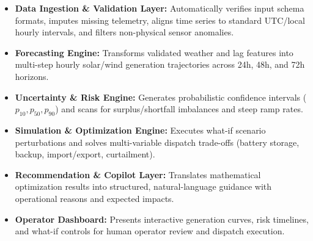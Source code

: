 \begin{itemize}[leftmargin=1.5em, itemsep=0.25em]
    \item \textbf{Data Ingestion \& Validation Layer:} Automatically verifies input schema formats, imputes missing telemetry, aligns time series to standard UTC/local hourly intervals, and filters non-physical sensor anomalies.
    \item \textbf{Forecasting Engine:} Transforms validated weather and lag features into multi-step hourly solar/wind generation trajectories across 24h, 48h, and 72h horizons.
    \item \textbf{Uncertainty \& Risk Engine:} Generates probabilistic confidence intervals ($p_{10}, p_{50}, p_{90}$) and scans for surplus/shortfall imbalances and steep ramp rates.
    \item \textbf{Simulation \& Optimization Engine:} Executes what-if scenario perturbations and solves multi-variable dispatch trade-offs (battery storage, backup, import/export, curtailment).
    \item \textbf{Recommendation \& Copilot Layer:} Translates mathematical optimization results into structured, natural-language guidance with operational reasons and expected impacts.
    \item \textbf{Operator Dashboard:} Presents interactive generation curves, risk timelines, and what-if controls for human operator review and dispatch execution.
\end{itemize}
